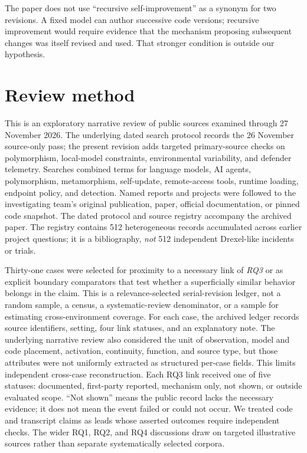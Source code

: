 \documentclass[11pt,letterpaper]{article}
\begin{document}
The paper does not use ``recursive self-improvement'' as a synonym for two revisions. A fixed model can author successive code versions; recursive improvement would require evidence that the mechanism proposing subsequent changes was itself revised and used. That stronger condition is outside our hypothesis.

\section{Review method}\label{sec:method}

This is an exploratory narrative review of public sources examined through 27 November 2026. The underlying dated search protocol records the 26 November source-only pass; the present revision adds targeted primary-source checks on polymorphism, local-model constraints, environmental variability, and defender telemetry. Searches combined terms for language models, AI agents, polymorphism, metamorphism, self-update, remote-access tools, runtime loading, endpoint policy, and detection. Named reports and projects were followed to the investigating team's original publication, paper, official documentation, or pinned code snapshot. The dated protocol and source registry accompany the archived paper. The registry contains 512 heterogeneous records accumulated across earlier project questions; it is a bibliography, \emph{not} 512 independent Drexel-like incidents or trials.

Thirty-one cases were selected for proximity to a necessary link of \emph{RQ3} or as explicit boundary comparators that test whether a superficially similar behavior belongs in the claim. This is a relevance-selected serial-revision ledger, not a random sample, a census, a systematic-review denominator, or a sample for estimating cross-environment coverage. For each case, the archived ledger records source identifiers, setting, four link statuses, and an explanatory note. The underlying narrative review also considered the unit of observation, model and code placement, activation, continuity, function, and source type, but those attributes were not uniformly extracted as structured per-case fields. This limits independent cross-case reconstruction. Each RQ3 link received one of five statuses: documented, first-party reported, mechanism only, not shown, or outside evaluated scope. ``Not shown'' means the public record lacks the necessary evidence; it does not mean the event failed or could not occur. We treated code and transcript claims as leads whose asserted outcomes require independent checks. The wider RQ1, RQ2, and RQ4 discussions draw on targeted illustrative sources rather than separate systematically selected corpora.
\end{document}
